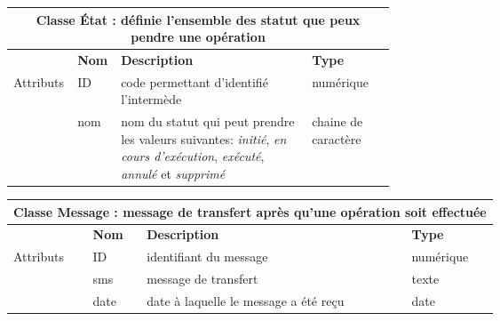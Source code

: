 		
		\begin{center}
			\noindent
			{\renewcommand{\arraystretch}{2}\begin{tabularx}{\linewidth}{|l|l|p{0.5\linewidth}|X|}
					\hline
					\multicolumn{4}{|c|}{\textbf{Classe État : définie l'ensemble des statut que peux pendre une opération}} \\
					
					\hline
					
					& \textbf{Nom} & \textbf{Description} & \textbf{Type} \\
					\multirow{3}{*}{Attributs} & ID & code permettant d'identifié l'intermède & numérique \\
					
					& nom & nom du statut qui peut prendre les valeurs suivantes: \textit{initié},
					\textit{en cours d'exécution}, \textit{exécuté}, \textit{annulé} et \textit{supprimé} & chaine de caractère\\
					
					\hline
			\end{tabularx}}
			\label{classe Etat}
		\end{center}
	
		\begin{center}
			{\renewcommand{\arraystretch}{1.5}\begin{tabularx}{\textwidth}{|l|l|l|X|}
					\hline
					\multicolumn{4}{|c|}{\textbf{Classe Message : message de transfert après qu'une opération soit effectuée}} \\
					
					\hline
					
					& \textbf{Nom} & \textbf{Description} & \textbf{Type} \\
					\multirow{3}{*}{Attributs} & ID & identifiant du message & numérique \\
					
					& sms & message de transfert &  texte\\
					
					& date & date à laquelle le message a été reçu & date \\
					
					\hline
			\end{tabularx}}
			\label{table7}
		\end{center}
		
